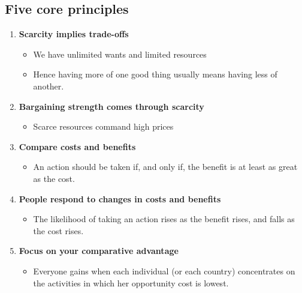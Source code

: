 \documentclass{article}
\begin{document}
\begin{multicols}{2}
\subsection{Five core principles}
\begin{enumerate}
\item \textbf{Scarcity implies trade-offs}
\begin{itemize}
	\item We have unlimited wants and limited resources
	\item Hence having more of one good thing usually means having less of another.
\end{itemize}
\item \textbf{Bargaining strength comes through scarcity}
\begin{itemize}
	\item Scarce resources command high prices
\end{itemize}
\item \textbf{Compare costs and benefits}
\begin{itemize}
	\item An action should be taken if, and only if, the benefit is at least as great as the cost.
\end{itemize}
\item \textbf{People respond to changes in costs and benefits}
\begin{itemize}
	\item The likelihood of taking an action rises as the benefit rises, and falls as the cost rises.
\end{itemize}
\item \textbf{Focus on your comparative advantage}
\begin{itemize}
	\item  Everyone gains when each individual (or each country) concentrates on the activities in which her opportunity cost is lowest.
\end{itemize}
\end{enumerate}


\end{multicols}
\end{document}
